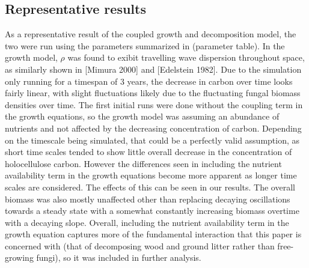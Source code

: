 \documentclass[10pt]{article}
\begin{document}
\subsection*{Representative results}
As a representative result of the coupled growth and decomposition model, the two were run using the parameters summarized in (parameter table). In the growth model, $\rho$ was found to exibit travelling wave dispersion throughout space, as similarly shown in [Mimura 2000] and [Edelstein 1982]. Due to the simulation only running for a timespan of 3 years, the decrease in carbon over time looks fairly linear, with slight fluctuations likely due to the fluctuating fungal biomass densities over time. The first initial runs were done without the coupling term in the growth equations, so the growth model was assuming an abundance of nutrients and not affected by the decreasing concentration of carbon. Depending on the timescale being simulated, that could be a perfectly valid assumption, as short time scales tended to show little overall decrease in the concentration of holocellulose carbon. However the differences seen in including the nutrient availability term in the growth equations become more apparent as longer time scales are considered. The effects of this can be seen in our results. The overall biomass was also mostly unaffected other than replacing decaying oscillations towards a steady state with a somewhat constantly increasing biomass overtime with a decaying slope. Overall, including the nutrient availability term in the growth equation captures more of the fundamental interaction that this paper is concerned with (that of decomposing wood and ground litter rather than free-growing fungi), so it was included in further analysis. 
\end{document}
